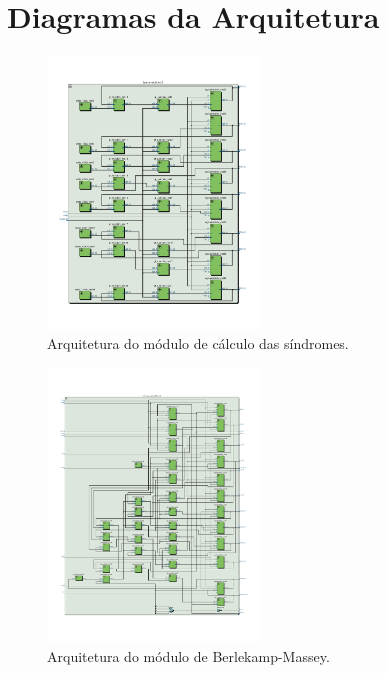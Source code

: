 \chapter{Diagramas da Arquitetura}

\begin{figure}[h]
	\caption{\label{fig_sindrome_arq}Arquitetura do módulo de cálculo das síndromes.}
	\centering
	\includegraphics[width=0.5\textwidth, trim={0 1.2cm 0 3cm}, clip]{RS/SindromeRTL.pdf}
\end{figure}

\begin{figure}[h]
	\caption{\label{fig_berlekamp_arq}Arquitetura do módulo de Berlekamp-Massey.}
	\centering
	\includegraphics[width=0.5\textwidth, trim={0 1.2cm 0 3cm}, clip]{RS/BerlekampRTL.pdf}
\end{figure}

